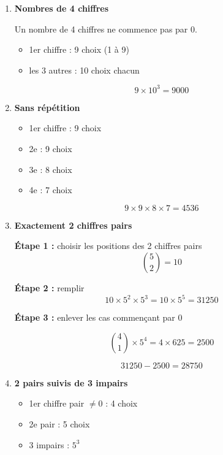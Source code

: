 \documentclass[12pt]{article}
\begin{document}
\begin{enumerate}[label=\textbf{Exercice \arabic*.}]

\item \textbf{Nombres de 4 chiffres}

Un nombre de 4 chiffres ne commence pas par 0.

\begin{itemize}
    \item 1er chiffre : 9 choix (1 à 9)
    \item les 3 autres : 10 choix chacun
\end{itemize}

\[
9 \times 10^3 = 9000
\]

\vspace{0.3cm}

\item \textbf{Sans répétition}

\begin{itemize}
    \item 1er chiffre : 9 choix
    \item 2e : 9 choix
    \item 3e : 8 choix
    \item 4e : 7 choix
\end{itemize}

\[
9 \times 9 \times 8 \times 7 = 4536
\]

\vspace{0.3cm}

\item \textbf{Exactement 2 chiffres pairs}

\textbf{Étape 1 :} choisir les positions des 2 chiffres pairs
\[
\binom{5}{2} = 10
\]

\textbf{Étape 2 :} remplir
\[
10 \times 5^2 \times 5^3 = 10 \times 5^5 = 31250
\]

\textbf{Étape 3 :} enlever les cas commençant par 0

\[
\binom{4}{1} \times 5^4 = 4 \times 625 = 2500
\]

\[
31250 - 2500 = 28750
\]

\vspace{0.3cm}

\item \textbf{2 pairs suivis de 3 impairs}

\begin{itemize}
    \item 1er chiffre pair $\neq 0$ : 4 choix
    \item 2e pair : 5 choix
    \item 3 impairs : $5^3$
\end{itemize}


\end{enumerate}
\end{document}
